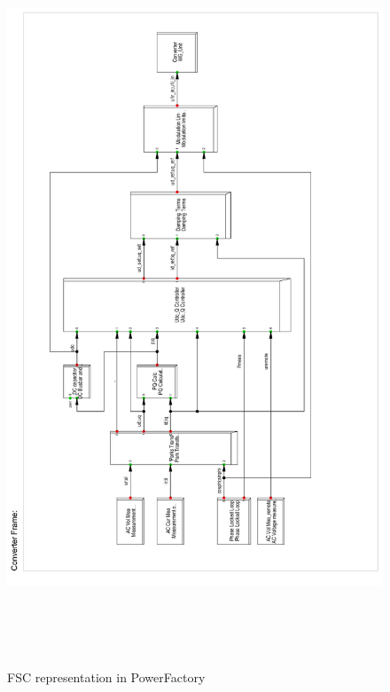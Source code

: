 \begin{figure}[H]
\centering
    \includegraphics[height = 22cm,width = \textwidth]{Diagrams/Appendix_A/FSC_PFD.pdf}
    \caption{FSC representation in PowerFactory \cite{erlich_description_nodate}}
    \label{fig:FSC_PFD}
\end{figure}


